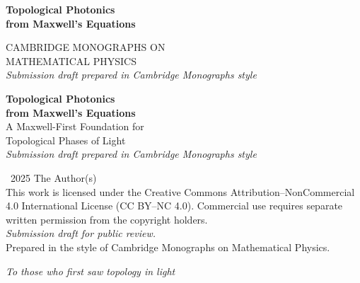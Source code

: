 \documentclass[11pt,twoside,openright]{book}
\theoremstyle{plain}
\theoremstyle{definition}
\theoremstyle{remark}
\begin{document}
\frontmatter

\begin{titlepage}
\vspace*{3cm}
\begin{center}
{\LARGE\bfseries Topological Photonics\\[6pt]
from Maxwell's Equations}
\end{center}
\end{titlepage}

\thispagestyle{empty}
\vspace*{4cm}
\begin{center}
{\large CAMBRIDGE MONOGRAPHS ON\\MATHEMATICAL PHYSICS}\\[12pt]
{\itshape Submission draft prepared in Cambridge Monographs style}
\end{center}
\cleardoublepage

\begin{titlepage}
\vspace*{2cm}
\begin{center}
{\huge\bfseries Topological Photonics\\[6pt]
from Maxwell's Equations}\\[2cm]
{\Large A Maxwell-First Foundation for\\Topological Phases of Light}\\[3cm]
\vfill
{\itshape Submission draft prepared in Cambridge Monographs style}
\end{center}
\end{titlepage}

\thispagestyle{empty}
\vspace*{\fill}
\noindent\textcopyright\ 2025 The Author(s)\\
This work is licensed under the Creative Commons Attribution--NonCommercial
4.0 International License (CC BY--NC 4.0). Commercial use requires separate
written permission from the copyright holders.\\[6pt]
\textit{Submission draft for public review.}\\[6pt]
Prepared in the style of Cambridge Monographs on Mathematical Physics.
\cleardoublepage

\thispagestyle{empty}
\vspace*{4cm}
\begin{center}
\itshape To those who first saw topology in light
\end{center}
\cleardoublepage
\end{document}
